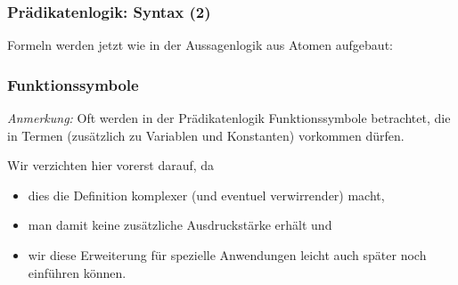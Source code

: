 \documentclass[onlymath]{beamer}
\begin{document}
\begin{frame}\frametitle{Prädikatenlogik: Syntax (2)}

Formeln werden jetzt wie in der Aussagenlogik aus Atomen aufgebaut:


\end{frame}
\begin{frame}\frametitle{Funktionssymbole}

\emph{Anmerkung:} Oft werden in der Prädikatenlogik Funktionssymbole
betrachtet, die in Termen (zusätzlich zu Variablen und Konstanten)
vorkommen dürfen.
\bigskip

Wir verzichten hier vorerst darauf, da
\begin{itemize}
\item dies die Definition komplexer (und eventuel verwirrender) macht,
\item man damit keine zusätzliche Ausdruckstärke erhält und
\item wir diese Erweiterung für spezielle Anwendungen leicht auch später noch einführen können.
\end{itemize}

\end{frame}
\end{document}

